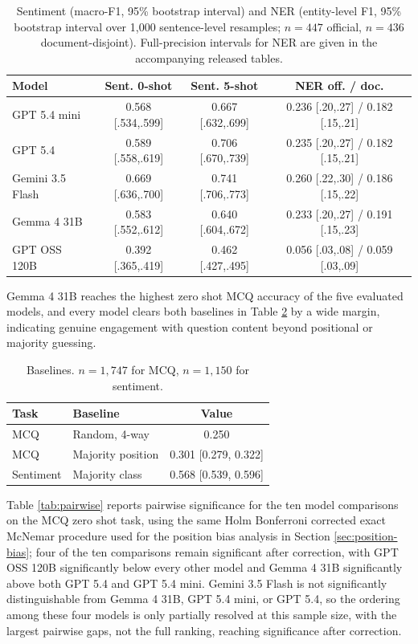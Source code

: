 \documentclass[11pt,a4paper]{article}
\begin{document}
\begin{table}[t]
\centering
\small
\begin{tabular}{lccc}
\toprule
\textbf{Model} & \textbf{Sent. 0-shot} & \textbf{Sent. 5-shot} & \textbf{NER off. / doc.} \\
\midrule
GPT 5.4 mini & 0.568 [.534,.599] & 0.667 [.632,.699] & 0.236 [.20,.27] / 0.182 [.15,.21] \\
GPT 5.4 & 0.589 [.558,.619] & 0.706 [.670,.739] & 0.235 [.20,.27] / 0.182 [.15,.21] \\
Gemini 3.5 Flash & 0.669 [.636,.700] & 0.741 [.706,.773] & 0.260 [.22,.30] / 0.186 [.15,.22] \\
Gemma 4 31B & 0.583 [.552,.612] & 0.640 [.604,.672] & 0.233 [.20,.27] / 0.191 [.15,.23] \\
GPT OSS 120B & 0.392 [.365,.419] & 0.462 [.427,.495] & 0.056 [.03,.08] / 0.059 [.03,.09] \\
\bottomrule
\end{tabular}
\caption{Sentiment (macro-F1, 95\% bootstrap interval) and NER (entity-level F1, 95\% bootstrap interval over 1,000 sentence-level resamples; $n{=}447$ official, $n{=}436$ document-disjoint). Full-precision intervals for NER are given in the accompanying released tables.}
\label{tab:sent-ner-main}
\end{table}

Gemma 4 31B reaches the highest zero shot MCQ accuracy of the five evaluated models, and every model clears both baselines in Table \ref{tab:baselines} by a wide margin, indicating genuine engagement with question content beyond positional or majority guessing.

\begin{table}[t]
\centering
\small
\begin{tabular}{llc}
\toprule
\textbf{Task} & \textbf{Baseline} & \textbf{Value} \\
\midrule
MCQ & Random, 4-way & 0.250 \\
MCQ & Majority position & 0.301 [0.279, 0.322] \\
Sentiment & Majority class & 0.568 [0.539, 0.596] \\
\bottomrule
\end{tabular}
\caption{Baselines. $n{=}1{,}747$ for MCQ, $n{=}1{,}150$ for sentiment.}
\label{tab:baselines}
\end{table}

Table \ref{tab:pairwise} reports pairwise significance for the ten model comparisons on the MCQ zero shot task, using the same Holm Bonferroni corrected exact McNemar procedure used for the position bias analysis in Section \ref{sec:position-bias}; four of the ten comparisons remain significant after correction, with GPT OSS 120B significantly below every other model and Gemma 4 31B significantly above both GPT 5.4 and GPT 5.4 mini. Gemini 3.5 Flash is not significantly distinguishable from Gemma 4 31B, GPT 5.4 mini, or GPT 5.4, so the ordering among these four models is only partially resolved at this sample size, with the largest pairwise gaps, not the full ranking, reaching significance after correction.
\end{document}
